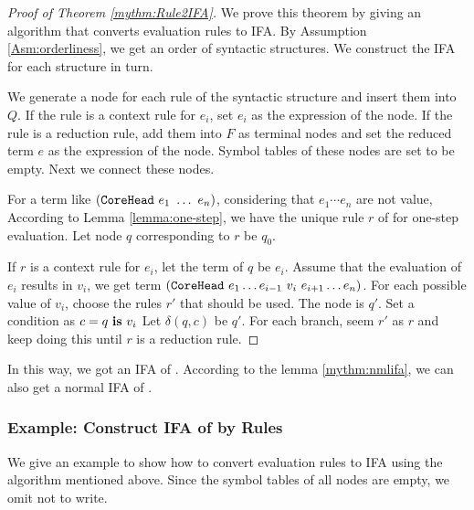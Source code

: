 \begin{proof}[Proof of Theorem \ref{mythm:Rule2IFA}]

We prove this theorem by giving an algorithm that converts evaluation rules to IFA. By Assumption \ref{Asm:orderliness}, we get an order of syntactic structures. We construct the IFA for each structure in turn.

We generate a node for each rule of the syntactic structure  and insert them into $Q$. If the rule is a context rule for $e_i$, set $e_i$ as the expression of the node. If the rule is a reduction rule, add them into $F$ as terminal nodes and set the reduced term $e$ as the expression of the node. Symbol tables of these nodes are set to be empty. Next we connect these nodes.

For a term like $(\mbox{\tt CoreHead}~e_1~\ldots~e_n)$, considering that $e_1\cdots e_n$ are not value, According to Lemma \ref{lemma:one-step}, we have the unique rule $r$ of  for one-step evaluation. Let node $q$ corresponding to $r$ be $q_0$.

If $r$ is a context rule for $e_i$, let the term of $q$ be $e_i$. Assume that the evaluation of $e_i$ results in $v_i$, we get term $(\mbox{\tt CoreHead}~e_1 \ldots e_{i-1}~v_i~e_{i+1} \ldots e_n)$. For each possible value of $v_i$, choose the rules $r'$ that should be used. The node is $q'$. Set a condition as $c=q~\mbox{\rm \bf is}~v_i$ Let $\delta(q, c)$ be $q'$. For each branch, seem $r'$ as $r$ and keep doing this until $r$ is a reduction rule.

\end{proof}

In this way, we got an IFA of . According to the lemma \ref{mythm:nmlifa}, we can also get a normal IFA of . 

\subsubsection{Example: Construct IFA of  by Rules}

We give an example to show how to convert evaluation rules to IFA using the algorithm mentioned above. Since the symbol tables of all nodes are empty, we omit not to write.


